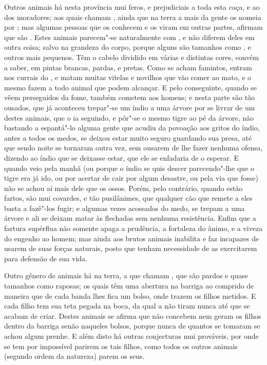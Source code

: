 Outros animais há nesta província mui feros, e prejudiciais a toda esta
caça, e ao  dos moradores; aos quais chamam , ainda que na
terra a mais da gente os nomeia por ; mas algumas pessoas que os
conhecem e os viram em outras partes, afirmam que são . Estes
animais  parecem"-se naturalmente com , e não diferem deles em
outra coisa; salvo na grandeza do corpo, porque alguns são tamanhos
como , e outros mais pequenos. Têm o cabelo dividido em várias
e distintas cores, convém a saber, em pintas brancas, pardas, e pretas.
Como se acham famintos, entram nos currais do , e matam muitas
vitelas e novilhos que vão comer ao mato, e o mesmo fazem a todo animal				%
que podem alcançar. E pelo conseguinte, quando se vêem perseguidos da
fome, também cometem aos homens; e nesta parte são tão ousados, que já
aconteceu trepar"-se um índio a uma árvore por se livrar de um destes
animais, que o ia seguindo, e pôr"-se o mesmo tigre ao pé da árvore, não			%
bastando a espantá"-lo alguma gente que acudiu da povoação aos gritos do
índio, antes a todos os medos, se deixou estar muito seguro guardando
sua presa, até que sendo noite se tornaram outra vez, sem ousarem de
lhe fazer nenhuma ofensa, dizendo ao índio que se deixasse estar, que
ele se enfadaria de o esperar. E quando veio pela manhã (ou porque o índio se
quis descer parecendo"-lhe que o tigre era já ido, ou por acertar de cair por			%
algum desastre, ou pela via que fosse) não se achou aí mais dele que os ossos.
Porém, pelo contrário, quando estão fartos, são mui covardes, e tão pusilânimes,
que qualquer cão que remete a eles basta a fazê"-los fugir; e algumas vezes
acossados do medo, se trepam a uma árvore e ali se deixam matar às flechadas sem nenhuma resistência. Enfim que a fartura supérflua
não somente apaga a prudência, a fortaleza do ânimo, e a viveza do engenho ao			%
homem; mas ainda aos brutos animais inabilita e faz incapazes de usarem de suas
forças naturais, posto que tenham necessidade de as exercitarem para defensão de
sua vida.

Outro gênero de animais há na terra, a que chamam , que são
pardos e quase tamanhos como raposas; os quais têm uma abertura na
barriga ao comprido de maneira que de cada banda lhes fica um bolso,
onde trazem os filhos metidos. E cada filho tem sua teta pegada na
boca, da qual a não tiram nunca até que se acabam de criar. Destes
animais se afirma que não concebem nem geram os filhos dentro da barriga
senão naqueles bolsos, porque nunca de quantos se tomaram se achou
algum prenhe. E além disto há outras conjecturas mui prováveis, por
onde se tem por impossível parirem os tais filhos, como todos os outros
animais (segundo ordem da natureza) parem os seus.


